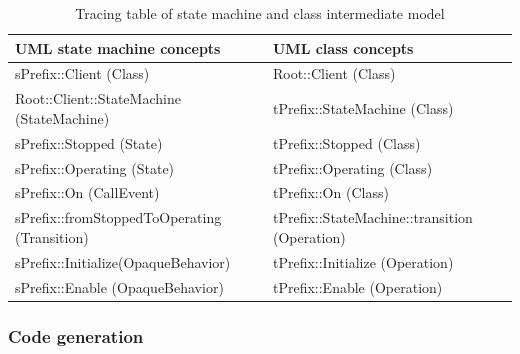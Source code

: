 \begin{table}[]
\centering
\caption{Tracing table of state machine and class intermediate model}
\label{table:trace}
\begin{tabular}{|p{4cm}|p{4cm}|}
\hline
\rowcolor{Gray}
UML state machine concepts                                                 & UML class concepts                                     \\ \hline
sPrefix::Client (Class)                     & Root::Client (Class)                                   \\ \hline
Root::Client::StateMachine  (StateMachine)                                  & tPrefix::StateMachine (Class)   \\ \hline
sPrefix::Stopped (State)                     & tPrefix::Stopped (Class)        \\ \hline
sPrefix::Operating (State)                   & tPrefix::Operating (Class)      \\ \hline
sPrefix::On (CallEvent)                      & tPrefix::On (Class)             \\ \hline
sPrefix::fromStoppedToOperating (Transition) & tPrefix::StateMachine::transition (Operation) \\ \hline
sPrefix::Initialize(OpaqueBehavior)          & tPrefix::Initialize (Operation) \\ \hline
sPrefix::Enable (OpaqueBehavior)             & tPrefix::Enable (Operation)     \\ \hline
\end{tabular}
\end{table}

\subsubsection{Code generation}
\label{subsec:codegen}


